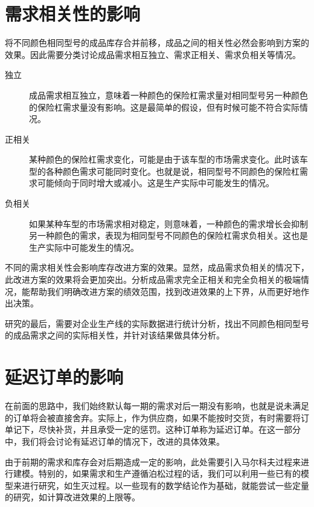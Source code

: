\section{需求相关性的影响}

将不同颜色相同型号的成品库存合并前移，成品之间的相关性必然会影响到方案的效果。因此需要分类讨论成品需求相互独立、需求正相关、需求负相关等情况。
\begin{description}
\item[独立]
成品需求相互独立，意味着一种颜色的保险杠需求量对相同型号另一种颜色的保险杠需求量没有影响。这是最简单的假设，但有时候可能不符合实际情况。
\item[正相关]
某种颜色的保险杠需求变化，可能是由于该车型的市场需求变化。此时该车型的各种颜色需求可能同时变化。也就是说，相同型号不同颜色的保险杠需求可能倾向于同时增大或减小。这是生产实际中可能发生的情况。
\item[负相关]
如果某种车型的市场需求相对稳定，则意味着，一种颜色的需求增长会抑制另一种颜色的需求，表现为相同型号不同颜色的保险杠需求负相关。这也是生产实际中可能发生的情况。
\end{description}

不同的需求相关性会影响库存改进方案的效果。显然，成品需求负相关的情况下，此改进方案的效果将会更加突出。分析成品需求完全正相关和完全负相关的极端情况，能帮助我们明确改进方案的绩效范围，找到改进效果的上下界，从而更好地作出决策。

研究的最后，需要对企业生产线的实际数据进行统计分析，找出不同颜色相同型号的成品需求之间的实际相关性，并针对该结果做具体分析。



\section{延迟订单的影响}

在前面的思路中，我们始终默认每一期的需求对后一期没有影响，也就是说未满足的订单将会被直接舍弃。实际上，作为供应商，如果不能按时交货，有时需要将订单记下，尽快补货，并且承受一定的惩罚。这种订单称为延迟订单。在这一部分中，我们将会讨论有延迟订单的情况下，改进的具体效果。

由于前期的需求和库存会对后期造成一定的影响，此处需要引入马尔科夫过程来进行建模。特别的，如果需求和生产遵循泊松过程的话，我们可以利用一些已有的模型来进行研究，如生灭过程。以一些现有的数学结论作为基础，就能尝试一些定量的研究，如计算改进效果的上限等。








